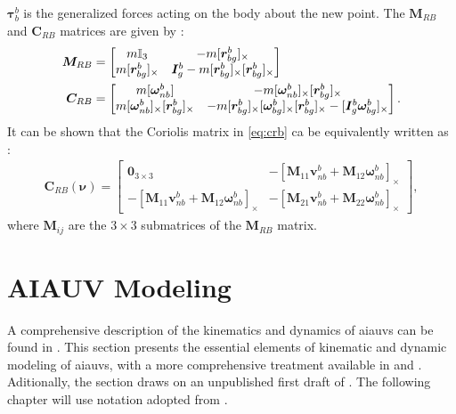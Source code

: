 $\bm{\tau}_{b}^b$ is the generalized forces acting on the body about the new
point. The $\bm{M}_{RB}$ and $\bm{C}_{RB}$ matrices are given by \cite{fossen2021}:
\begin{subequations}
\begin{align}
    \bm{M}_{RB} &= \begin{bmatrix}
        m \mathbb{I}_3 & - m [\bm{r}_{bg}^b]_{\times} \\
        m [\bm{r}_{bg}^b]_{\times} & \bm{I}_g^b - m [\bm{r}_{bg}^b]_{\times}[\bm{r}_{bg}^b]_{\times}
    \end{bmatrix} \\
    \bm{C}_{RB} &= \begin{bmatrix}
        m [\bm{\omega}_{nb}^b] & -m [\bm{\omega}_{nb}^b]_{\times}[\bm{r}_{bg}^b]_{\times} \\
        m [\bm{\omega}_{nb}^b]_{\times}[\bm{r}_{bg}^b]_{\times} & 
        -m [ \bm{r}_{bg}^b ]_{\times} [ \bm{\omega}_{bg}^b ]_{\times} [ \bm{r}_{bg}^b ]_{\times} -
        [ \bm{I}_g^b \bm{\omega}_{bg}^b ]_{\times}
    \end{bmatrix}. \label{eq:crb}
\end{align}
\end{subequations}
It can be shown that the Coriolis matrix in \autoref{eq:crb} ca be equivalently
written as \cite{sagatun1991}:
\begin{align}
    \bm{C}_{RB}(\bm\nu) = \begin{bmatrix}
        \bm{0}_{3 \times 3} & 
        -\left[\bm{M}_{11}\bm{v}_{nb}^{b} + \bm{M}_{12}\bm{\omega}_{nb}^b \right]_{\times} \\
        -\left[\bm{M}_{11}\bm{v}_{nb}^{b} + \bm{M}_{12}\bm{\omega}_{nb}^b \right]_{\times} &
        -\left[\bm{M}_{21}\bm{v}_{nb}^{b} + \bm{M}_{22}\bm{\omega}_{nb}^b \right]_{\times}
    \end{bmatrix},
\end{align}
where $\bm{M}_{ij}$ are the $3 \times 3$ submatrices of the $\bm{M}_{RB}$ matrix.

\newpage
\section{AIAUV Modeling}

A comprehensive description of the kinematics and dynamics of
\gls{aiauv}s can be found in \cite{schmidt2018}.
This section presents the essential elements of kinematic and dynamic modeling of \gls{aiauv}s, with a more comprehensive
treatment available in \cite{from2014} and \cite{schmidt2018}.
Aditionally, the section draws on an unpublished
first draft of \cite{schmidt2018}. The following chapter will use notation adopted from
\cite{from2014}.

